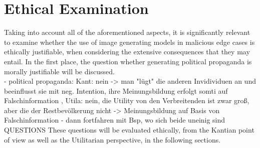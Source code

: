 \documentclass[10pt,twocolumn,twoside]{osajnl}
\begin{document}
\section{Ethical Examination}
Taking into account all of the aforementioned aspects, it is significantly relevant to examine whether the use of image generating models in malicious edge cases is ethically justifiable, when considering the extensive consequences
that they may entail. In the first place, the question whether generating political propaganda is morally justifiable will be discussed. 
\\
- political propaganda: Kant: nein -> man "lügt" die anderen Invidividuen an und beeinflusst sie mit neg. Intention, ihre Meinungsbildung erfolgt somti auf Falschinformation
, Utila: nein, die Utility von den Verbreitenden ist zwar groß, aber die der Restbevölkerung nicht -> Meinungsbildung auf Basis von Falschinformation  
- dann fortfahren mit Bsp, wo sich beide uneinig sind
QUESTIONS
These questions will be evaluated ethically, from the Kantian point of view as well as the Utilitarian perspective, in the following sections. 




\end{document}
